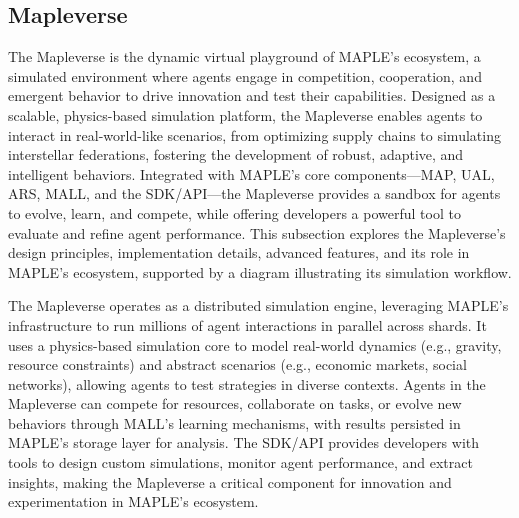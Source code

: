 \documentclass[a4paper,11pt]{article}
\begin{document}
\pagebreak

\subsection{Mapleverse}
The Mapleverse is the dynamic virtual playground of MAPLE’s ecosystem, a simulated environment where agents engage in competition, cooperation, and emergent behavior to drive innovation and test their capabilities. Designed as a scalable, physics-based simulation platform, the Mapleverse enables agents to interact in real-world-like scenarios, from optimizing supply chains to simulating interstellar federations, fostering the development of robust, adaptive, and intelligent behaviors. Integrated with MAPLE’s core components—MAP, UAL, ARS, MALL, and the SDK/API—the Mapleverse provides a sandbox for agents to evolve, learn, and compete, while offering developers a powerful tool to evaluate and refine agent performance. This subsection explores the Mapleverse’s design principles, implementation details, advanced features, and its role in MAPLE’s ecosystem, supported by a diagram illustrating its simulation workflow.

The Mapleverse operates as a distributed simulation engine, leveraging MAPLE’s infrastructure to run millions of agent interactions in parallel across shards. It uses a physics-based simulation core to model real-world dynamics (e.g., gravity, resource constraints) and abstract scenarios (e.g., economic markets, social networks), allowing agents to test strategies in diverse contexts. Agents in the Mapleverse can compete for resources, collaborate on tasks, or evolve new behaviors through MALL’s learning mechanisms, with results persisted in MAPLE’s storage layer for analysis. The SDK/API provides developers with tools to design custom simulations, monitor agent performance, and extract insights, making the Mapleverse a critical component for innovation and experimentation in MAPLE’s ecosystem.
\end{document}
